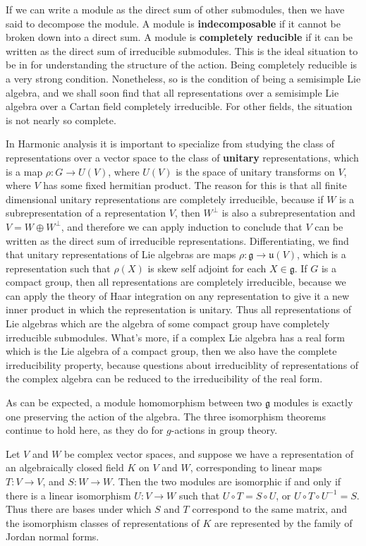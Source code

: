 If we can write a module as the direct sum of other submodules, then we have said to decompose the module. A module is {\bf indecomposable} if it cannot be broken down into a direct sum. A module is {\bf completely reducible} if it can be written as the direct sum of irreducible submodules. This is the ideal situation to be in for understanding the structure of the action. Being completely reducible is a very strong condition. Nonetheless, so is the condition of being a semisimple Lie algebra, and we shall soon find that all representations over a semisimple Lie algebra over a Cartan field completely irreducible. For other fields, the situation is not nearly so complete.

In Harmonic analysis it is important to specialize from studying the class of representations over a vector space to the class of {\bf unitary} representations, which is a map $\rho: G \to U(V)$, where $U(V)$ is the space of unitary transforms on $V$, where $V$ has some fixed hermitian product. The reason for this is that all finite dimensional unitary representations are completely irreducible, because if $W$ is a subrepresentation of a representation $V$, then $W^\perp$ is also a subrepresentation and $V = W \oplus W^\perp$, and therefore we can apply induction to conclude that $V$ can be written as the direct sum of irreducible representations. Differentiating, we find that unitary representations of Lie algebras are maps $\rho: \mathfrak{g} \to \mathfrak{u}(V)$, which is a representation such that $\rho(X)$ is skew self adjoint for each $X \in \mathfrak{g}$. If $G$ is a compact group, then all representations are completely irreducible, because we can apply the theory of Haar integration on any representation to give it a new inner product in which the representation is unitary. Thus all representations of Lie algebras which are the algebra of some compact group have completely irreducible submodules. What's more, if a complex Lie algebra has a real form which is the Lie algebra of a compact group, then we also have the complete irreducibility property, because questions about irreduciblity of representations of the complex algebra can be reduced to the irreducibility of the real form.

As can be expected, a module homomorphism between two $\mathfrak{g}$ modules is exactly one preserving the action of the algebra. The three isomorphism theorems continue to hold here, as they do for $g$-actions in group theory.

\begin{example}
    Let $V$ and $W$ be complex vector spaces, and suppose we have a representation of an algebraically closed field $K$ on $V$ and $W$, corresponding to linear maps $T: V \to V$, and $S: W \to W$. Then the two modules are isomorphic if and only if there is a linear isomorphism $U: V \to W$ such that $U \circ T = S \circ U$, or $U \circ T \circ U^{-1} = S$. Thus there are bases under which $S$ and $T$ correspond to the same matrix, and the isomorphism classes of representations of $K$ are represented by the family of Jordan normal forms.
\end{example}

